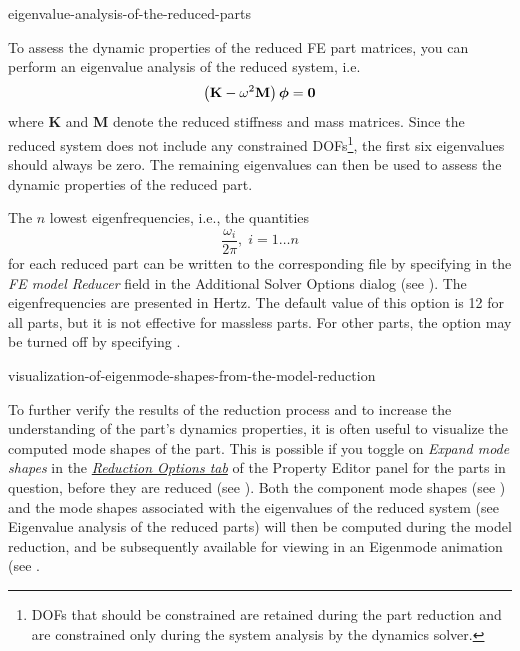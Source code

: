 {
           {eigenvalue-analysis-of-the-reduced-parts}

To assess the dynamic properties of the reduced FE part matrices,
you can perform an eigenvalue analysis of the reduced system, i.e.
$$\left({\bf K} - \omega^2{\bf M}\right)\mbox{\boldmath$\phi$} = {\bf 0}$$
where \textbf{K} and \textbf{M} denote the reduced stiffness and mass matrices.
Since the reduced system does not include any constrained DOFs\footnote{
DOFs that should be constrained are retained during the part reduction and are
constrained only during the system analysis by the dynamics solver.},
the first six eigenvalues should always be zero. The remaining eigenvalues
can then be used to assess the dynamic properties of the reduced part.

The $n$ lowest eigenfrequencies, i.e., the quantities
$$\frac{\omega_i}{2\pi}, \; i = 1 \ldots n $$
for each reduced part can be written to the corresponding  file
by specifying  in the {\sl FE model Reducer} field in the
Additional Solver Options dialog (see
).
The eigenfrequencies are presented in Hertz.
The default value of this option is 12 for all parts,
but it is not effective for massless parts.
For other parts, the option may be turned off by specifying .


           {visualization-of-eigenmode-shapes-from-the-model-reduction}

To further verify the results of the reduction process and to increase
the understanding of the part's dynamics properties, it is often useful
to visualize the computed mode shapes of the part.
This is possible if you toggle on {\sl Expand mode shapes} in the
\protect\hyperlink{reduction-options-tab}{\sl Reduction Options tab}
of the Property Editor panel for the parts in question, before they are reduced
(see ).
Both the component mode shapes
(see )
and the mode shapes associated with the eigenvalues of the reduced system
(see 
{Eigenvalue analysis of the reduced parts}) will then be computed during the
model reduction, and be subsequently available for viewing in an Eigenmode
animation
(see .

}
